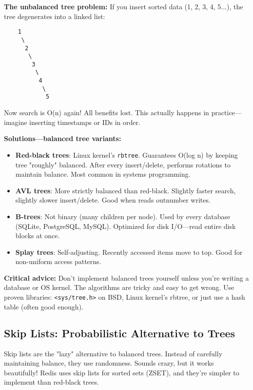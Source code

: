 \begin{warningbox}
\textbf{The unbalanced tree problem:} If you insert sorted data (1, 2, 3, 4, 5...), the tree degenerates into a linked list:
\begin{verbatim}
    1
     \
      2
       \
        3
         \
          4
           \
            5
\end{verbatim}

Now search is O(n) again! All benefits lost. This actually happens in practice—imagine inserting timestamps or IDs in order.

\textbf{Solutions—balanced tree variants:}
\begin{itemize}
    \item \textbf{Red-black trees}: Linux kernel's \texttt{rbtree}. Guarantees O(log n) by keeping tree "roughly" balanced. After every insert/delete, performs rotations to maintain balance. Most common in systems programming.

    \item \textbf{AVL trees}: More strictly balanced than red-black. Slightly faster search, slightly slower insert/delete. Good when reads outnumber writes.

    \item \textbf{B-trees}: Not binary (many children per node). Used by every database (SQLite, PostgreSQL, MySQL). Optimized for disk I/O—read entire disk blocks at once.

    \item \textbf{Splay trees}: Self-adjusting. Recently accessed items move to top. Good for non-uniform access patterns.
\end{itemize}

\textbf{Critical advice:} Don't implement balanced trees yourself unless you're writing a database or OS kernel. The algorithms are tricky and easy to get wrong. Use proven libraries: \texttt{<sys/tree.h>} on BSD, Linux kernel's rbtree, or just use a hash table (often good enough).
\end{warningbox}

\subsection{Skip Lists: Probabilistic Alternative to Trees}

Skip lists are the "lazy" alternative to balanced trees. Instead of carefully maintaining balance, they use randomness. Sounds crazy, but it works beautifully! Redis uses skip lists for sorted sets (ZSET), and they're simpler to implement than red-black trees.

